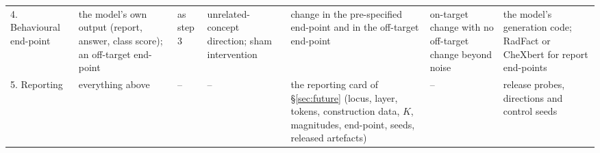 \begin{table}[!tbp]
\begin{tabular}{@{}L{1.6cm}L{2.6cm}L{1.45cm}L{2.95cm}L{2.6cm}L{1.95cm}L{1.8cm}@{}}
4. Behavioural end-point & the model's own output (report, answer, class score); an off-target end-point & as step 3 & unrelated-concept direction; sham intervention & change in the pre-specified end-point and in the off-target end-point & on-target change with no off-target change beyond noise & the model's generation code; RadFact or CheXbert for report end-points \\
5. Reporting & everything above & -- & -- & the reporting card of \S\ref{sec:future} (locus, layer, tokens, construction data, $K$, magnitudes, end-point, seeds, released artefacts) & -- & release probes, directions and control seeds \\
\bottomrule
\end{tabular}
\end{table}
